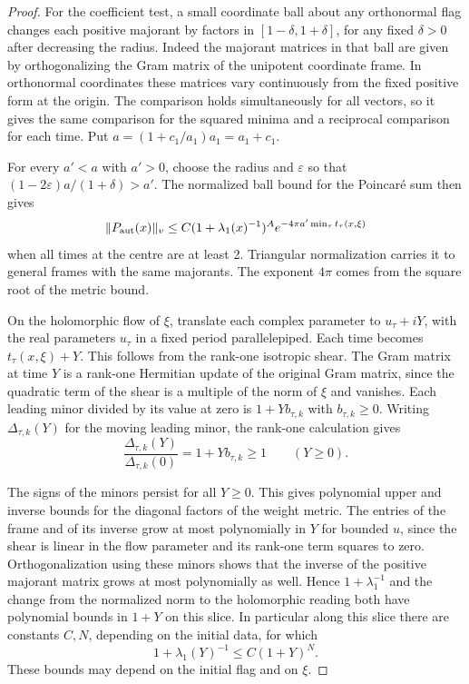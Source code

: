\begin{proof}
For the coefficient test, a small coordinate ball
about any orthonormal flag changes each positive
majorant by factors in \([1-\delta,1+\delta]\), for
any fixed \(\delta>0\) after decreasing the radius.
Indeed the majorant matrices in that ball are given by
orthogonalizing the Gram matrix of the unipotent
coordinate frame. In orthonormal coordinates these
matrices vary continuously from the fixed positive
form at the origin. The comparison holds simultaneously
for all vectors, so it gives the same comparison for
the squared minima and a reciprocal comparison for
each time. Put \(a=(1+c_1/a_1)a_1=a_1+c_1\).

For every \(a'<a\) with \(a'>0\), choose the radius
and \(\varepsilon\) so that
\((1-2\varepsilon)a/(1+\delta)>a'\).
The normalized ball bound for the Poincar\'e sum then
gives
\[
 \|P_{\rm aut}(x)\|_v
     \le C(1+\lambda_1(x)^{-1})^A
               e^{-4\pi a'\min_\tau t_\tau(x,\xi)}
\]
when all times at the centre are at least 2. Triangular
normalization carries it to general frames with the
same majorants. The exponent \(4\pi\) comes from the
square root of the metric bound.

On the holomorphic flow of \(\xi\), translate each
complex parameter to \(u_\tau+iY\), with the real
parameters \(u_\tau\) in a fixed period parallelepiped.
Each time becomes \(t_\tau(x,\xi)+Y\). This follows
from the rank-one isotropic shear. The Gram matrix at
time \(Y\) is a rank-one Hermitian update of the
original Gram matrix, since the quadratic term of the
shear is a multiple of the norm of \(\xi\) and vanishes.
Each leading minor divided by its value at zero is
\(1+Y b_{\tau,k}\) with \(b_{\tau,k}\ge0\).
Writing \(\Delta_{\tau,k}(Y)\) for the moving leading minor, the rank-one calculation gives
\[
  \frac{\Delta_{\tau,k}(Y)}{\Delta_{\tau,k}(0)}=1+Yb_{\tau,k}\ge1\qquad(Y\ge0).
\]

The signs of the minors persist for all \(Y\ge0\).
This gives polynomial upper and inverse bounds for
the diagonal factors of the weight metric. The entries
of the frame and of its inverse grow at most polynomially
in \(Y\) for bounded \(u\), since the shear is linear
in the flow parameter and its rank-one term squares
to zero. Orthogonalization using these minors shows
that the inverse of the positive majorant matrix grows
at most polynomially as well. Hence
\(1+\lambda_1^{-1}\) and the change from the normalized
norm to the holomorphic reading both have polynomial
bounds in \(1+Y\) on this slice.
In particular along this slice there are constants \(C,N\), depending on the initial data, for which
\[
  1+\lambda_1(Y)^{-1}\le C(1+Y)^N .
\]
 These bounds may depend
on the initial flag and on \(\xi\).


\end{proof}
